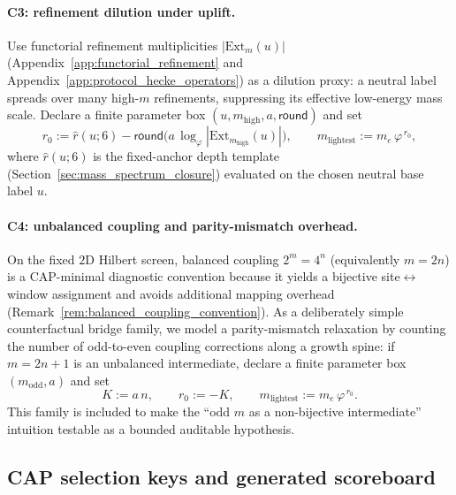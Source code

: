 \paragraph{C3: refinement dilution under uplift.}
\AuditTag Use functorial refinement multiplicities $|\mathrm{Ext}_m(u)|$ (Appendix~\ref{app:functorial_refinement} and Appendix~\ref{app:protocol_hecke_operators}) as a dilution proxy:
a neutral label spreads over many high-$m$ refinements, suppressing its effective low-energy mass scale.
Declare a finite parameter box $(u,m_{\mathrm{high}},a,\mathsf{round})$ and set
\[
r_0:=\widehat r(u;6)-\mathsf{round}\!\bigl(a\,\log_\varphi|\mathrm{Ext}_{m_{\mathrm{high}}}(u)|\bigr),
\qquad
m_{\mathrm{lightest}}:=m_e\,\varphi^{\,r_0},
\]
where $\widehat r(u;6)$ is the fixed-anchor depth template (Section~\ref{sec:mass_spectrum_closure}) evaluated on the chosen neutral base label $u$.

\paragraph{C4: unbalanced coupling and parity-mismatch overhead.}
\AuditTag On the fixed $2$D Hilbert screen, balanced coupling $2^m=4^n$ (equivalently $m=2n$) is a CAP-minimal diagnostic convention because it yields a bijective site$\leftrightarrow$window assignment and avoids additional mapping overhead (Remark~\ref{rem:balanced_coupling_convention}).
As a deliberately simple counterfactual bridge family, we model a parity-mismatch relaxation by counting the number of odd-to-even coupling corrections along a growth spine:
if $m=2n+1$ is an unbalanced intermediate, declare a finite parameter box $(m_{\mathrm{odd}},a)$ and set
\[
K:=a\,n,\qquad r_0:=-K,\qquad m_{\mathrm{lightest}}:=m_e\,\varphi^{\,r_0}.
\]
This family is included to make the ``odd $m$ as a non-bijective intermediate'' intuition testable as a bounded auditable hypothesis.

\subsection{CAP selection keys and generated scoreboard}
\label{subsec:neutrino_mech_selection_and_scoreboard}

